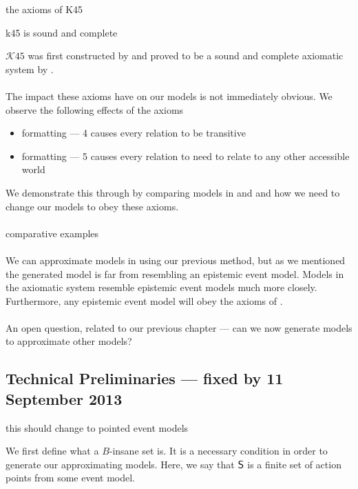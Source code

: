 \begin{lemma} \label{k45axioms}
\FIXME the axioms of K45
\end{lemma}

\begin{lemma} \label{k45SoundComplete}
\FIXME k45 is sound and complete
\end{lemma}

$\mathcal{K}45$ was first constructed by \FIXME and proved to be a sound and complete axiomatic
system by \FIXME.\\
\\
The impact these axioms have on our models is not immediately obvious.
We observe the following effects of the axioms
\begin{itemize}
	\item \FIXME formatting --- 4 causes every relation to be transitive
	\item \FIXME formatting --- 5 causes every relation to need to relate to any other accessible
world
\end{itemize}

We demonstrate this through by comparing models in \AXK and  and how we need to change
our models to obey these axioms.\\
\\
\FIXME comparative examples\\
\\
We can approximate models in  using our previous method, but as we mentioned
the generated model is far from resembling an epistemic event model.
Models in the axiomatic system  resemble epistemic event models much more closely.
Furthermore, any epistemic event model will obey the axioms of .\\
\\
An open question, related to our previous chapter --- can we now generate  models to
approximate other  models?

\subsection{Technical Preliminaries --- fixed by 11 September 2013}

\FIXME this should change to pointed event models

We first define what a $B$-insane set is.
It is a necessary condition in order to generate our approximating  models.
Here, we say that $\mathrm{\mathsf{S}}$ is a finite set of action points from some event model.

